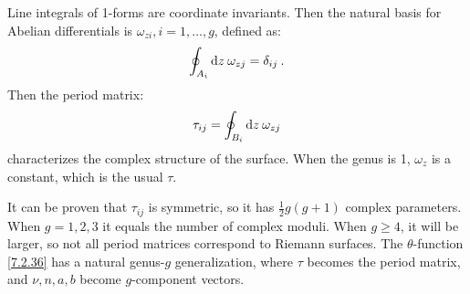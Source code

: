 Line integrals of 1-forms are coordinate invariants.
Then the natural basis for Abelian differentials is $\omega_{z i}, i=1, \ldots, g$, defined as:
\begin{equation}
	\oint_{A_{i}} \mathrm{d} z \: \omega_{z j}=\delta_{i j} \:.
	\label{9.2.7}
\end{equation}
Then the period matrix:
\begin{equation}
	\tau_{i j}=\oint_{B_{i}} \mathrm{d} z\: \omega_{z j} \label{9.2.8}
\end{equation}
characterizes the complex structure of the surface. When the genus is 1, $\omega_{z}$ is a constant, which is the usual $\tau$.

It can be proven that $\tau_{ij}$ is symmetric, so it has $\frac{1}{2} g(g+1)$ complex parameters.
When $g=1,2,3$ it equals the number of complex moduli. 
When $g \geq 4$, it will be larger, so not all period matrices correspond to Riemann surfaces.
The $\theta$-function \eqref{7.2.36} has a natural genus-$g$ generalization, 
where $\tau$ becomes the period matrix, and $\nu, n, a, b$ become $g$-component vectors.
